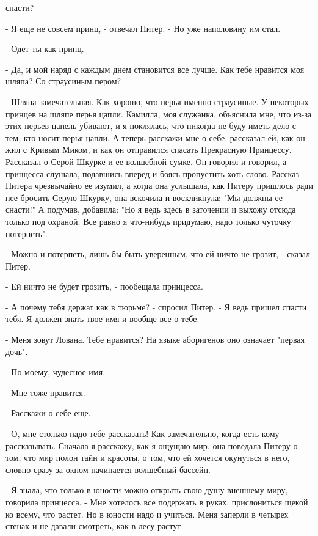 спасти?
\par- Я еще не совсем принц, - отвечал Питер. - Но уже наполовину им 
стал.
\par- Одет ты как принц.
\par- Да, и мой наряд с каждым днем становится все лучше. Как тебе 
нравится моя шляпа? Со страусиным пером?
\par- Шляпа замечательная. Как хорошо, что перья именно страусиные. У 
некоторых принцев на шляпе перья цапли. Камилла, моя служанка, 
объяснила мне, что из-за этих перьев цапель убивают, и я поклялась, 
что никогда не буду иметь дело с тем, кто носит перья цапли. А теперь 
расскажи мне о себе.
 рассказал ей, как он жил с Кривым Миком, и как он отправился 
спасать Прекрасную Принцессу. Рассказал о Серой Шкурке и ее волшебной 
сумке. Он говорил и говорил, а принцесса слушала, подавшись вперед и 
боясь пропустить хоть слово. Рассказ Питера чрезвычайно ее изумил, а 
когда она услышала, как Питеру пришлось ради нее бросить Серую Шкурку, 
она вскочила и воскликнула: "Мы должны ее снасти!" А подумав, 
добавила: "Но я ведь здесь в заточении и выхожу отсюда только под 
охраной. Все равно я что-нибудь придумаю, надо только чуточку 
потерпеть".
\par- Можно и потерпеть, лишь бы быть уверенным, что ей ничто не 
грозит, - сказал Питер.
\par- Ей ничто не будет грозить, - пообещала принцесса.
\par- А почему тебя держат как в тюрьме? - спросил Питер. - Я ведь 
пришел спасти тебя. Я должен знать твое имя и вообще все о тебе.
\par- Меня зовут Лована. Тебе нравится? На языке аборигенов оно 
означает "первая дочь".
\par- По-моему, чудесное имя.
\par- Мне тоже нравится.
\par- Расскажи о себе еще.
\par- О, мне столько надо тебе рассказать! Как замечательно, когда 
есть кому рассказывать. Сначала я расскажу, как я ощущаю мир.
 она поведала Питеру о том, что мир полон тайн и красоты, о том, 
что ей хочется окунуться в него, словно сразу за окном начинается 
волшебный бассейн.
\par- Я знала, что только в юности можно открыть свою душу внешнему 
миру, - говорила принцесса. - Мне хотелось все подержать в руках, 
прислониться щекой ко всему, что растет. Но в юности надо и учиться. 
Меня заперли в четырех стенах и не давали смотреть, как в лесу растут 
